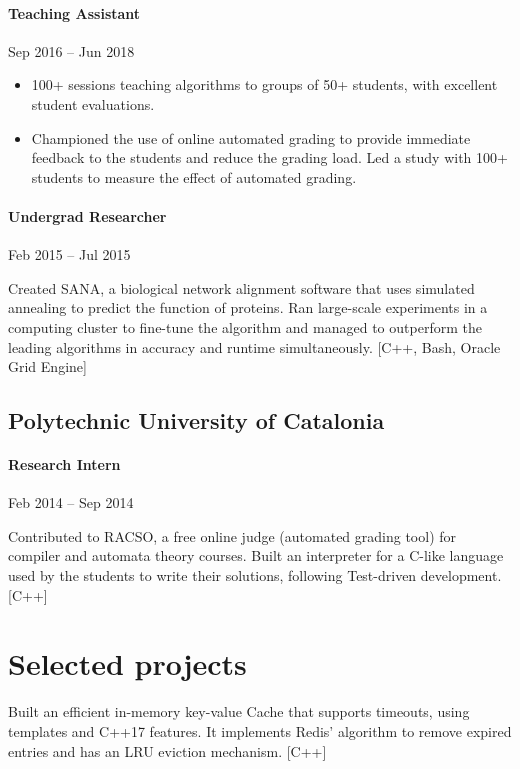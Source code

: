 \documentclass[letterpaper,10pt,oneside]{article}
\begin{document}
\paragraph*{Teaching Assistant} \hfill Sep 2016 -- Jun 2018

\vspace{-1px}
\begin{itemize}[leftmargin=15px]
	\item 100+ sessions teaching algorithms to groups of 50+ students, with excellent student evaluations.
	\item Championed the use of online automated grading to provide immediate feedback to the students and reduce the grading load. Led a study with 100+ students to measure the effect of automated grading.
\end{itemize}
\paragraph*{Undergrad Researcher} \hfill Feb 2015 -- Jul 2015

\vspace{2px}
\noindent Created SANA, a biological network alignment software that uses simulated annealing to predict the function of proteins. Ran large-scale experiments in a computing cluster to fine-tune the algorithm and managed to outperform the leading algorithms in accuracy and runtime simultaneously. [C++, Bash, Oracle Grid Engine]
	 
\vspace{3px}
\subsection*{Polytechnic University of Catalonia}
\vspace{-2px}
\paragraph*{Research Intern} \hfill Feb 2014 -- Sep 2014

\vspace{2px}
\noindent Contributed to RACSO, a free online judge (automated grading tool) for compiler and automata theory courses. Built an interpreter for a C-like language used by the students to write their solutions, following Test-driven development. [C++]

\section*{Selected projects}
Built an efficient in-memory key-value Cache that supports timeouts, using templates and C++17 features. It implements Redis' algorithm to remove expired entries and has an LRU eviction mechanism. [C++]
\end{document}
